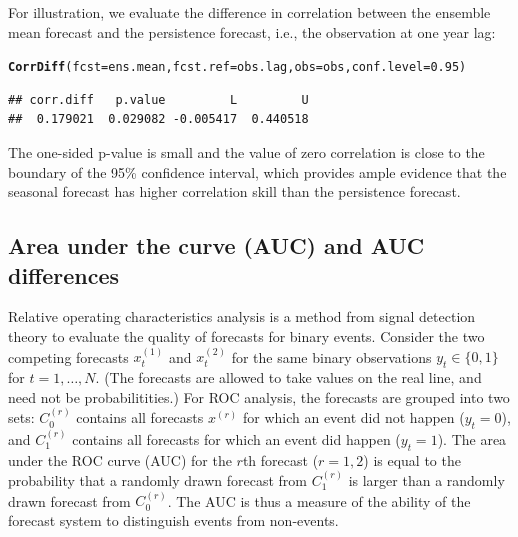 \documentclass[article]{jss}\usepackage{graphicx, color}
\makeatletter
\newcommand{\hlfunctioncall}[1]{\textcolor[rgb]{0,0.501960784313725,0.752941176470588}{\textbf{#1}}}%
\newenvironment{kframe}{%
 \def\at@end@of@kframe{}%
 \ifinner\ifhmode%
  \def\at@end@of@kframe{\end{minipage}}%
  \begin{minipage}{\columnwidth}%
 \fi\fi%
 \def\FrameCommand##1{\hskip\@totalleftmargin \hskip-\fboxsep
 \colorbox{shadecolor}{##1}\hskip-\fboxsep
     \hskip-\linewidth \hskip-\@totalleftmargin \hskip\columnwidth}%
 \MakeFramed {\advance\hsize-\width
   \@totalleftmargin\z@ \linewidth\hsize
   \@setminipage}}%
 {\par\unskip\endMakeFramed%
 \at@end@of@kframe}
\newenvironment{knitrout}{}{} %
\makeatother
\begin{document}
For illustration, we evaluate the difference in correlation between the ensemble mean forecast and the persistence forecast, i.e., the observation at one year lag:
%
\begin{knitrout}
\color{fgcolor}\begin{kframe}
\begin{alltt}
\hlfunctioncall{CorrDiff}(fcst=ens.mean, fcst.ref=obs.lag, obs=obs, conf.level=0.95)
\end{alltt}
\begin{verbatim}
## corr.diff   p.value         L         U 
##  0.179021  0.029082 -0.005417  0.440518
\end{verbatim}
\end{kframe}
\end{knitrout}

%
The one-sided p-value is small and the value of zero correlation is close to the boundary of the 95\% confidence interval, which provides ample evidence that the seasonal forecast has higher correlation skill than the persistence forecast.


\subsection{Area under the curve (AUC) and AUC differences}

Relative operating characteristics \citep[ROC, ][]{mason2002areas} analysis is a method from signal detection theory to evaluate the quality of forecasts for binary events.
Consider the two competing forecasts $x^{(1)}_t$ and $x^{(2)}_t$ for the same binary observations $y_t \in \{0, 1\}$ for $t=1,\dots,N$.
(The forecasts are allowed to take values on the real line, and need not be probabilitities.)
For ROC analysis, the forecasts are grouped into two sets: $C^{(r)}_0$ contains all forecasts $x^{(r)}$ for which an event did not happen ($y_t=0$), and $C^{(r)}_1$ contains all forecasts for which an event did happen ($y_t = 1$).
The area under the ROC curve (AUC) for the $r$th forecast ($r=1,2$) is equal to the probability that a randomly drawn forecast from $C^{(r)}_1$ is larger than a randomly drawn forecast from $C^{(r)}_0$.
The AUC is thus a measure of the ability of the forecast system to distinguish events from non-events.
\end{document}
